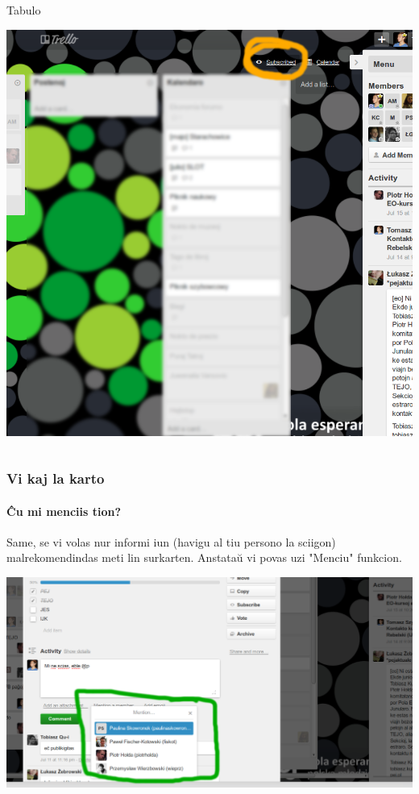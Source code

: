 \begin{frame}
\begin{columns}
\begin{block}{Tabulo}
\begin{center}
    		\includegraphics[scale=0.10]{ekranoj/abonu-tabulon}
    		\end{center}
    	\end{block}

	\end{columns}
  \end{frame}


  \begin{frame}
    \frametitle{Vi kaj la karto}
    \framesubtitle{Ĉu mi menciis tion?}
		
	Same, se vi volas nur informi iun (havigu al tiu persono la sciigon) malrekomendindas meti lin surkarten. Anstataŭ vi povas uzi "Menciu" funkcion.
\begin{center}

	\includegraphics[scale=0.24]{ekranoj/mencio}

\end{center}
  \end{frame}

